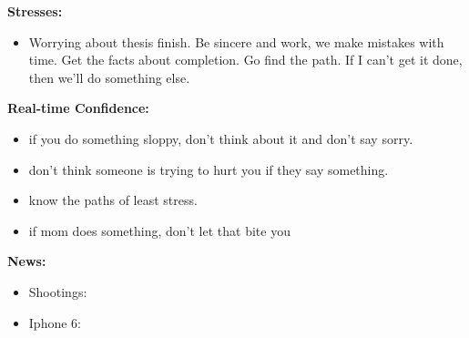 \documentclass[11pt]{article}
\begin{document}
{            %
            \textbf{Stresses:}\\
            \begin{itemize}
              \tiny \item \tiny Worrying about thesis finish. Be sincere and work, we
              make mistakes with time. Get the facts about completion. Go
              find the path. If I can't get it done, then we'll do something
              else.
            \end{itemize}
            
            \textbf{Real-time Confidence:}\\
            \begin{itemize}
              \tiny \item \tiny if you do something sloppy, don't think about it and don't say sorry.
            \item \tiny don't think someone is trying to hurt you if they say something.
            \item \tiny know the paths of least stress.
            \item \tiny if mom does something, don't let that bite you
            \end{itemize}
            
            \textbf{News:} 
            \begin{itemize}
            \item \tiny Shootings: 
            \item \tiny Iphone 6: 
            \end{itemize} 
            
}
\end{document}
